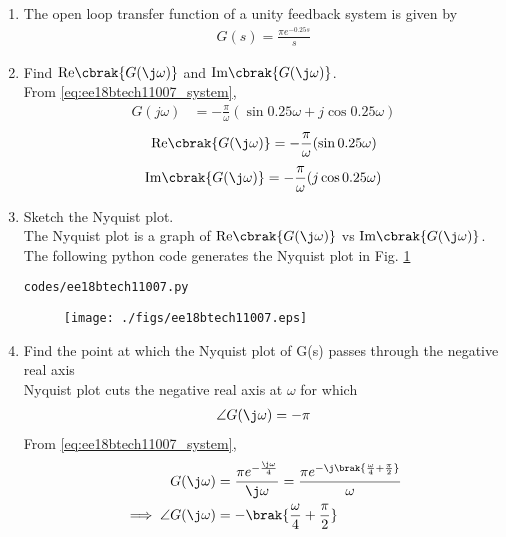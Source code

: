 \begin{enumerate}[label=\thesection.\arabic*.,ref=\thesection.\theenumi]
\item The open loop transfer function of a unity feedback system is given by
\begin{align}
\label{eq:ee18btech11007_system}
 G(s)=\frac{\pi e^{-0.25s}}{s}
\end{align}
\item Find $\text{Re} \cbrak{G(\j \omega)}$ and $\text{Im} \cbrak{G(\j \omega)}$.
\\
\solution From \eqref{eq:ee18btech11007_system},
%
 \begin{align}
G(j\omega)&=-\frac{\pi}{\omega}(\sin{0.25\omega}+j\cos{0.25\omega})
\end{align}
\begin{align}
 \text{Re} \cbrak{G(\j \omega)}=-\frac{\pi}{\omega}(\sin{0.25\omega}) 
\end{align}
\begin{align}
 \text{Im} \cbrak{G(\j \omega)}=-\frac{\pi}{\omega}(j\cos{0.25\omega}) 
\end{align}
%
\item Sketch the Nyquist plot.
\\
\solution The Nyquist plot is a graph of $\text{Re} \cbrak{G(\j \omega)}$  vs $\text{Im} \cbrak{G(\j \omega)}$.
The following python code generates the Nyquist plot in Fig.  \ref{fig:ee18btech11007}
\begin{lstlisting}
codes/ee18btech11007.py
\end{lstlisting}
%
\begin{figure}[!h]
  \texttt{[image: ./figs/ee18btech11007.eps]}
  \caption{}
  \label{fig:ee18btech11007}
\end{figure}
%
\item Find the point at which the Nyquist plot of G(s) passes through the negative real axis
\\
\solution  Nyquist plot cuts the negative real axis at $\omega $ for which 
\begin{align}
\angle G(\j\omega)=-\pi
\label{eq:ee18btech11007_system_neg_real}
\end{align}
From \eqref{eq:ee18btech11007_system},
\begin{align}
 G(\j\omega)&=\frac{\pi e^{-\frac{\j\omega}{4}}}{\j\omega} = \frac{\pi e^{-\j\brak{\frac{\omega}{4}+\frac{\pi}{2}}}}{\omega}
\\
\implies \angle{ G(\j\omega)} &= -\brak{\frac{\omega}{4}+\frac{\pi}{2}}

\end{align}
\end{enumerate}
